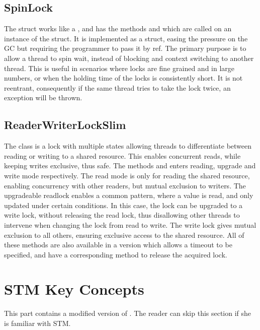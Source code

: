 \subsection{SpinLock}
The  struct\cite{msdnSpinLock} works like a , and has the methods   and  which are called on an instance of the struct. It is implemented as a struct, easing the pressure on the \ac{GC} but requiring the programmer to pass it by ref. The primary purpose is to allow a thread to spin wait, instead of blocking and context switching to another thread. This is useful in scenarios where locks are fine grained and in large numbers, or when the holding time of the locks is consistently short. It is not reentrant, consequently if the same thread tries to take the lock twice, an exception will be thrown. 

\subsection{ReaderWriterLockSlim}
The class \cite{msdnReaderWriterLockSlim} is a lock with multiple states allowing threads to differentiate between reading or writing to a shared resource. This enables concurrent reads, while keeping writes exclusive, thus safe. The methods   and  enters reading, upgrade and write mode respectively. The read mode is only for reading the shared resource, enabling concurrency with other readers, but mutual exclusion to writers. The upgradeable readlock enables a common pattern, where a value is read, and only updated under certain conditions. In this case, the lock can be upgraded to a write lock, without releasing the read lock, thus disallowing other threads to intervene when changing the lock from read to write. The write lock gives mutual exclusion to all others, ensuring exclusive access to the shared resource. All of these methods are also available in a version which allows a timeout to be specified, and have a corresponding  method to release the acquired lock.

\section{STM Key Concepts}
This part contains a modified version of \cite[p. 43-48]{dpt907e14trending}. The reader can skip this section if she is familiar with \ac{STM}.  
\label{chap:stm_key_concepts}

